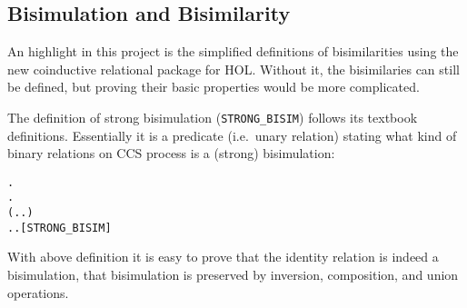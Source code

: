 
\subsection{Bisimulation and Bisimilarity}
\label{ss:bb}
An highlight in this project is the simplified definitions of
  bisimilarities using the new coinductive relational package for HOL.  
Without it, the bisimilaries can still be defined,  but
  proving their basic properties would be more complicated.

The definition of strong bisimulation (\texttt{STRONG_BISIM})  follows
  its textbook definitions. Essentially it is a predicate (i.e.~unary relation) stating
what kind of binary relations on CCS process is a (strong) bisimulation:
\begin{alltt}
  \HOLSymConst{\HOLTokenDefEquality{}}
  \HOLSymConst{\HOLTokenForall{}} .
         \HOLSymConst{\HOLTokenImp{}}
      \HOLSymConst{\HOLTokenForall{}}.
          (\HOLSymConst{\HOLTokenForall{}}.  \HOLTokenTransBegin{}\HOLTokenTransEnd {} \HOLSymConst{\HOLTokenImp{}} \HOLSymConst{\HOLTokenExists{}}.  \HOLTokenTransBegin{}\HOLTokenTransEnd {} \HOLSymConst{\HOLTokenConj{}}   ) \HOLSymConst{\HOLTokenConj{}}
          \HOLSymConst{\HOLTokenForall{}}.  \HOLTokenTransBegin{}\HOLTokenTransEnd {} \HOLSymConst{\HOLTokenImp{}} \HOLSymConst{\HOLTokenExists{}}.  \HOLTokenTransBegin{}\HOLTokenTransEnd {} \HOLSymConst{\HOLTokenConj{}}   \hfill{[STRONG_BISIM]}
\end{alltt}
With above definition it is easy to prove that the identity
relation is indeed a bisimulation,  that bisimulation is preserved by
inversion, composition, and union operations.

